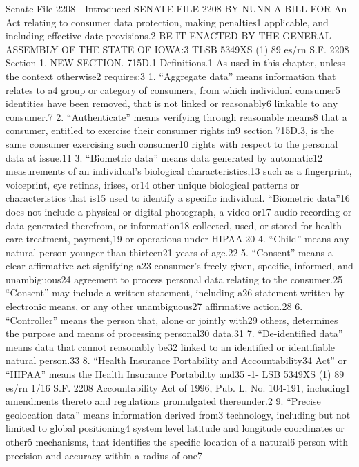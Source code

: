 Senate File 2208 - Introduced
SENATE FILE 2208
BY NUNN
A BILL FOR
An Act relating to consumer data protection, making penalties1
applicable, and including effective date provisions.2
BE IT ENACTED BY THE GENERAL ASSEMBLY OF THE STATE OF IOWA:3
TLSB 5349XS (1) 89
es/rn
S.F. 2208
Section 1. NEW SECTION. 715D.1 Definitions.1
As used in this chapter, unless the context otherwise2
requires:3
1. “Aggregate data” means information that relates to a4
group or category of consumers, from which individual consumer5
identities have been removed, that is not linked or reasonably6
linkable to any consumer.7
2. “Authenticate” means verifying through reasonable means8
that a consumer, entitled to exercise their consumer rights in9
section 715D.3, is the same consumer exercising such consumer10
rights with respect to the personal data at issue.11
3. “Biometric data” means data generated by automatic12
measurements of an individual’s biological characteristics,13
such as a fingerprint, voiceprint, eye retinas, irises, or14
other unique biological patterns or characteristics that is15
used to identify a specific individual. “Biometric data”16
does not include a physical or digital photograph, a video or17
audio recording or data generated therefrom, or information18
collected, used, or stored for health care treatment, payment,19
or operations under HIPAA.20
4. “Child” means any natural person younger than thirteen21
years of age.22
5. “Consent” means a clear affirmative act signifying a23
consumer’s freely given, specific, informed, and unambiguous24
agreement to process personal data relating to the consumer.25
“Consent” may include a written statement, including a26
statement written by electronic means, or any other unambiguous27
affirmative action.28
6. “Controller” means the person that, alone or jointly with29
others, determines the purpose and means of processing personal30
data.31
7. “De-identified data” means data that cannot reasonably be32
linked to an identified or identifiable natural person.33
8. “Health Insurance Portability and Accountability34
Act” or “HIPAA” means the Health Insurance Portability and35
-1-
LSB 5349XS (1) 89
es/rn 1/16
S.F. 2208
Accountability Act of 1996, Pub. L. No. 104-191, including1
amendments thereto and regulations promulgated thereunder.2
9. “Precise geolocation data” means information derived from3
technology, including but not limited to global positioning4
system level latitude and longitude coordinates or other5
mechanisms, that identifies the specific location of a natural6
person with precision and accuracy within a radius of one7

